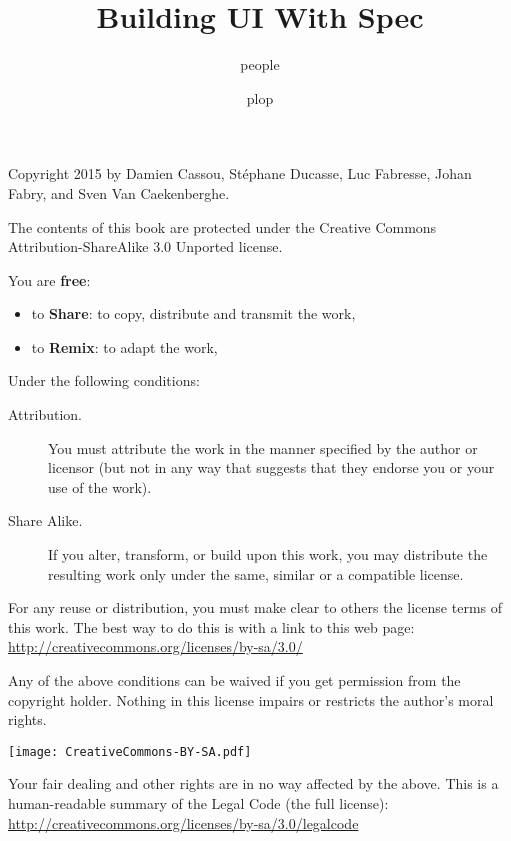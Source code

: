 \documentclass[10pt,twoside,english]{support/latex/sbabook/sbabook}
\title{Building UI With Spec}
\author{people}
\date{plop}
\begin{document}
\maketitle
\pagestyle{titlingpage}
\thispagestyle{titlingpage} %

\cleartoverso
{\small

  Copyright 2015 by Damien Cassou, Stéphane Ducasse, Luc Fabresse, Johan Fabry,
  and Sven Van Caekenberghe.

  The contents of this book are protected under the Creative Commons
  Attribution-ShareAlike 3.0 Unported license.

  You are \textbf{free}:
  \begin{itemize}
  \item to \textbf{Share}: to copy, distribute and transmit the work,
  \item to \textbf{Remix}: to adapt the work,
  \end{itemize}

  Under the following conditions:
  \begin{description}
  \item[Attribution.] You must attribute the work in the manner specified by the
    author or licensor (but not in any way that suggests that they endorse you
    or your use of the work).
  \item[Share Alike.] If you alter, transform, or build upon this work, you may
    distribute the resulting work only under the same, similar or a compatible
    license.
  \end{description}

  For any reuse or distribution, you must make clear to others the
  license terms of this work. The best way to do this is with a link to
  this web page: \\
  \url{http://creativecommons.org/licenses/by-sa/3.0/}

  Any of the above conditions can be waived if you get permission from
  the copyright holder. Nothing in this license impairs or restricts the
  author's moral rights.

  \begin{center}
    \texttt{[image: CreativeCommons-BY-SA.pdf]}
  \end{center}

  Your fair dealing and other rights are in no way affected by the
  above. This is a human-readable summary of the Legal Code (the full
  license): \\
  \url{http://creativecommons.org/licenses/by-sa/3.0/legalcode}

}
\end{document}
